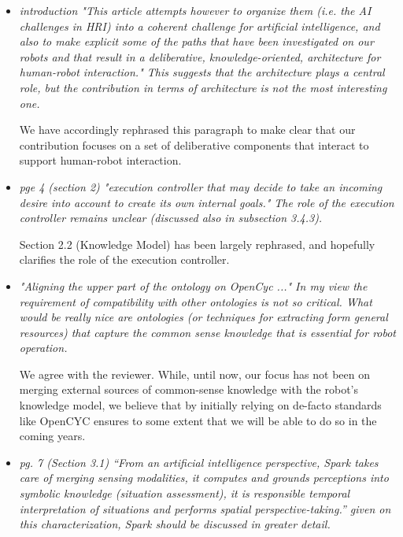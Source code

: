 \documentclass{article}
\begin{document}
\begin{itemize}

    \item \emph{introduction "This article attempts however to organize them
            (i.e. the AI challenges
            in HRI) into a coherent challenge for artificial intelligence, and
            also to make explicit 
            some of the paths that have been investigated on our robots and that
            result in a deliberative, 
            knowledge-oriented, architecture for human-robot interaction." This
            suggests that the
            architecture plays a central role, but the contribution in terms of
            architecture is not 
        the most interesting one.}

        We have accordingly rephrased this paragraph to make clear that our
        contribution focuses on a set of deliberative components that interact
        to support human-robot interaction.

    \item \emph{pge 4 (section 2)
            "execution controller that may decide to take an incoming desire
            into account to create
            its own internal goals." The role of the execution controller
            remains unclear (discussed
        also in subsection 3.4.3).}

            Section 2.2 (Knowledge Model) has been largely rephrased, and
            hopefully clarifies the role of the execution controller.

    \item \emph{"Aligning the upper part of the ontology on OpenCyc ..." In my
            view the requirement of
            compatibility with other ontologies is not so critical. What would
            be really nice are
            ontologies (or techniques for extracting form general resources)
            that capture
        the common sense knowledge that is essential for robot operation.}

            We agree with the reviewer. While, until now, our focus has not been on
            merging external sources of common-sense knowledge with the robot's
            knowledge model, we believe that by initially relying on de-facto
            standards like OpenCYC ensures to some extent that we will be able
            to do so in the coming years.

    \item \emph{pg. 7 (Section 3.1) ``From an artificial intelligence
            perspective, Spark takes care of merging sensing modalities, it
            computes and grounds perceptions into symbolic knowledge (situation
            assessment), it is responsible temporal interpretation of situations
            and performs spatial perspective-taking.'' given on this
        characterization, Spark should be discussed in greater detail.}
        

\end{itemize}
\end{document}
